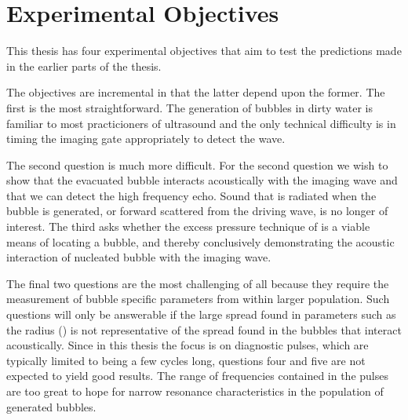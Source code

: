 \section{Experimental Objectives} \label{sec:WE:objectives}

This thesis has four experimental objectives that aim to test the predictions made in the earlier parts of the thesis.

The objectives are incremental in that the latter depend upon the former.
The first is the most straightforward.
The generation of bubbles in dirty water is familiar to most practicioners of ultrasound
and the only technical difficulty is in timing the imaging gate appropriately to detect the wave.

The second question is much more difficult.
For the second question we wish to show that the evacuated bubble interacts acoustically with the imaging wave
and that we can detect the high frequency echo.
Sound that is radiated when the bubble is generated,
or forward scattered from the driving wave, is no longer of interest.
The third asks whether the excess pressure technique of  is a viable means of locating a bubble, 
and thereby conclusively demonstrating the acoustic interaction of nucleated bubble with the imaging wave.

The final two questions are the most challenging of all because they require
the measurement of bubble specific parameters from within larger population.
Such questions will only be answerable if the large  spread found in parameters such
as the radius () is not representative of the spread found in the bubbles that interact acoustically.
Since in this thesis the focus is on diagnostic pulses, 
which are typically limited to being a few cycles long,
questions four and five are not expected to yield good results.
The range of frequencies contained in the pulses are too great to hope for narrow resonance characteristics in the population of generated bubbles.


